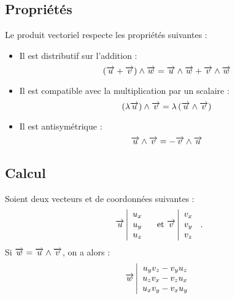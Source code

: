 	\subsection{Propriétés}
	Le produit vectoriel respecte les propriétés suivantes :
	\begin{itemize}
		\item Il est distributif sur l'addition :
			\begin{equation}
				\left(\overrightarrow{u}+\overrightarrow{v}\right)\wedge\overrightarrow{w}=\overrightarrow{u}\wedge\overrightarrow{w}+\overrightarrow{v}\wedge\overrightarrow{w}
			\end{equation}
		\item Il est compatible avec la multiplication par un scalaire :
			\begin{equation}
				\left(\lambda\overrightarrow{u}\right)\wedge\overrightarrow{v}=\lambda\left(\overrightarrow{u}\wedge\overrightarrow{v}\right)
			\end{equation}
		\item Il est antisymétrique :
			\begin{equation}
				\overrightarrow{u}\wedge\overrightarrow{v}=-\overrightarrow{v}\wedge\overrightarrow{u}
			\end{equation}
	\end{itemize}
	
	\subsection{Calcul}
		Soient deux vecteurs  et  de coordonnées suivantes :
		\begin{equation}
			\overrightarrow{u}
			\left|
			\begin{array}{c}
				u_x\\
				u_y\\
				u_z\\
			\end{array}
			\right.
			\quad
			\text{et }
			\overrightarrow{v}
			\left|
			\begin{array}{c}
				v_x\\
				v_y\\
				v_z\\
			\end{array}
			\right.
			\,.		
		\end{equation}
Si $\overrightarrow{w}=\overrightarrow{u}\wedge\overrightarrow{v}$, on a alors :
\begin{equation}
			\overrightarrow{w}
			\left|
			\begin{array}{c}
				u_yv_z-v_yu_z\\
				u_zv_x-v_zu_x\\
				u_xv_y-v_xu_y\\
			\end{array}
			\right.
\end{equation}

